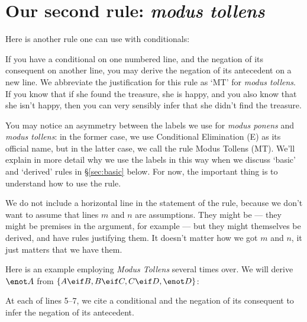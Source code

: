 \section{Our second rule: \emph{modus tollens}}

Here is another rule one can use with conditionals:

\begin{ndproof}
	 
\end{ndproof}

If you have a conditional on one numbered line, and the negation of its consequent on another line, you may derive the negation of its antecedent on a new line. We abbreviate the justification for this rule as `MT' for \emph{modus tollens}. If you know that if she found the treasure, she is happy, and you also know that she isn't happy, then you can very sensibly infer that she didn't find the treasure.

You may notice an asymmetry between the labels we use for \emph{modus ponens} and \emph{modus tollens}: in the former case, we use Conditional Elimination (\eif E) as its official name, but in the latter case, we call the rule Modus Tollens (MT). We'll explain in more detail why we use the labels in this way when we discuss `basic' and `derived' rules in \S\ref{sec:basic} below. For now, the important thing is to understand how to use the rule.

We do not include a horizontal line in the statement of the rule, because we don't want to assume that lines $m$ and $n$ are assumptions. They might be --- they might be premises in the argument, for example --- but they might themselves be derived, and have rules justifying them. It doesn't matter how we got $m$ and $n$, it just matters that we have them.

Here is an example employing \emph{Modus Tollens} several times over. We will derive $\enot A$ from $\{A \eif B, B \eif C, C \eif D, \enot D\}$:

\begin{ndproof}
	 
	 
	 
	 
\end{ndproof}

At each of lines 5--7, we cite a conditional and the negation of its consequent to infer the negation of its antecedent.

